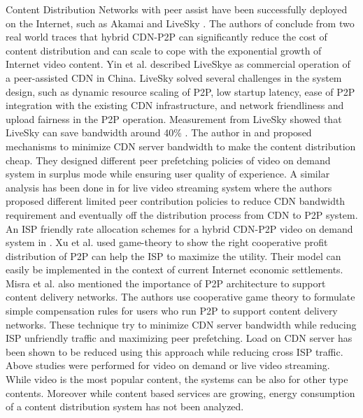 Content Distribution Networks with peer assist have been successfully deployed on the Internet, such as Akamai \cite{Huang:2008:UHC:1496046.1496064} and LiveSky \cite{Yin:2010:LEC:1823746.1823750}.  
The authors of \cite{Huang:2008:UHC:1496046.1496064} conclude from two real world traces that hybrid CDN-P2P can significantly reduce the cost of content distribution and can scale to cope with the exponential growth of Internet video content.  
Yin et al. \cite{Yin:2010:LEC:1823746.1823750} described LiveSkye as commercial operation of a peer-assisted CDN in China.  
LiveSky solved several challenges in the system design, such as dynamic resource scaling of P2P, low startup latency, ease of P2P integration with the existing CDN infrastructure, and network friendliness and upload fairness in the P2P operation.  
Measurement from LiveSky showed that LiveSky can save bandwidth around 40\% \cite{Yin:2010:LEC:1823746.1823750}.
The author in \cite{Huang:2007:IVP:1282427.1282396} and \cite{huang2007peer} proposed mechanisms to minimize CDN server bandwidth to make the content distribution cheap.
They designed different peer prefetching policies of video on demand system in surplus mode while ensuring user quality of experience.
A similar analysis has been done in \cite{xu2006analysis} for live video streaming system where the authors proposed different limited peer contribution policies to reduce CDN bandwidth requirement and eventually off the distribution process from CDN to P2P system. 
An ISP friendly rate allocation schemes for a hybrid CDN-P2P video on demand system in \cite{Wang:2008:IRA:1459359.1459397}. 
Xu et al.\cite{DBLP:journals/corr/abs-1212-4915} used game-theory to show the right cooperative profit distribution of P2P can help the ISP to maximize the utility.  
Their model can easily be implemented in the context of current Internet economic settlements.  
Misra et al.\cite{Misra:2010:IPS:1811099.1811064} also mentioned the importance of P2P architecture to support content delivery networks.
The authors use cooperative game theory to formulate simple compensation rules for users who run P2P to support content delivery networks.
These technique try to minimize CDN server bandwidth while reducing ISP unfriendly traffic and maximizing peer prefetching.
Load on CDN server has been shown to be reduced using this approach while reducing cross ISP traffic.
Above studies were performed for video on demand or live video streaming.
While video is the most popular content, the systems can be also for other type contents.
Moreover while content based services are growing, energy consumption of a content distribution system has not been analyzed.

